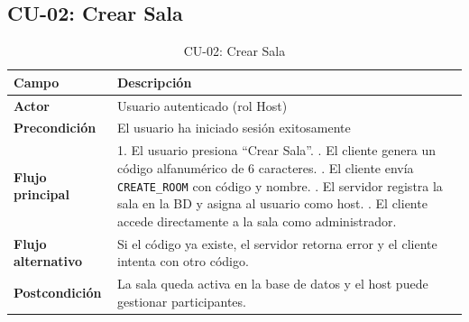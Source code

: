 \documentclass[12pt,a4paper]{article}
\begin{document}
\subsection*{CU-02: Crear Sala}
\begin{table}[H]
\centering
\small
\begin{tabular}{p{3.5cm}p{10cm}}
\toprule
\textbf{Campo} & \textbf{Descripci\'on} \\
\midrule
\textbf{Actor} & Usuario autenticado (rol Host) \\
\textbf{Precondici\'on} & El usuario ha iniciado sesi\'on exitosamente \\
\textbf{Flujo principal} &
  1. El usuario presiona ``Crear Sala''. \newline
  2. El cliente genera un c\'odigo alfanum\'erico de 6 caracteres. \newline
  3. El cliente env\'ia \texttt{CREATE\_ROOM} con c\'odigo y nombre. \newline
  4. El servidor registra la sala en la BD y asigna al usuario como host. \newline
  5. El cliente accede directamente a la sala como administrador. \\
\textbf{Flujo alternativo} & Si el c\'odigo ya existe, el servidor retorna error y el cliente intenta con otro c\'odigo. \\
\textbf{Postcondici\'on} & La sala queda activa en la base de datos y el host puede gestionar participantes. \\
\bottomrule
\end{tabular}
\caption{CU-02: Crear Sala}
\end{table}
\end{document}
